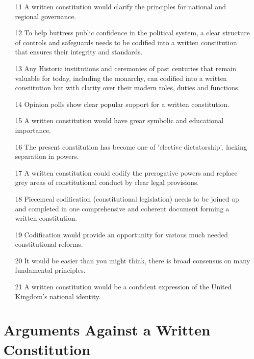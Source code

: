\documentclass[14pt,titlepage]{extarticle}
\begin{document}
\begin{itemize}
\item[11]
  A written constitution would clarify the principles for national and regional governance.

\item[12]
  To help buttress public confidence in
the political system, a clear structure of controls and safeguards needs to be
codified into a written constitution that ensures their integrity and standards.

\item[13]
  Any
Historic institutions and ceremonies of past centuries that remain valuable for
today, including the monarchy, can codified into a written constitution
but with clarity over their modern roles, duties and functions.

\item[14]
 Opinion polls show clear popular support for a written constitution. 

\item[15]
 A written constitution would have grear symbolic and educational importance.

\item[16]
 The present constitution has become one of 'elective dictatorship', lacking separation in powers.

\item[17]
  A written constitution could codify the prerogative powers and replace grey areas of constitutional conduct by clear legal provisions.

\item[18]
 Piecemeal codification (constitutional legislation) needs to be joined up and completed in one comprehensive and coherent document forming a written constitution.

\item[19]
  Codification would provide an opportunity for various much needed constitutional reforms.


\item[20]
 It would be easier than you might think, there is broad consensus on many fundamental principles.

\item[21]
  A written constitution would be a confident expression of the United
Kingdom's national identity.

\end{itemize}

\section{Arguments Against a Written Constitution}\label{Against}
\end{document}
